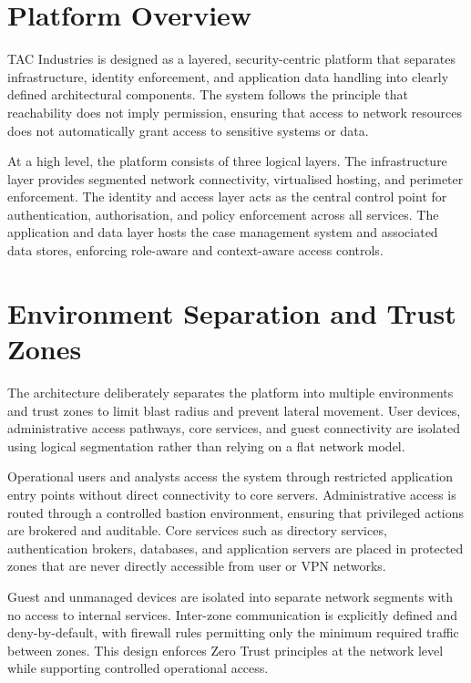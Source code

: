 \section{Platform Overview}

TAC Industries is designed as a layered, security-centric platform that separates infrastructure, identity enforcement, and application data handling into clearly defined architectural components. The system follows the principle that reachability does not imply permission, ensuring that access to network resources does not automatically grant access to sensitive systems or data.

At a high level, the platform consists of three logical layers. The infrastructure layer provides segmented network connectivity, virtualised hosting, and perimeter enforcement. The identity and access layer acts as the central control point for authentication, authorisation, and policy enforcement across all services. The application and data layer hosts the case management system and associated data stores, enforcing role-aware and context-aware access controls.

\section{Environment Separation and Trust Zones}

The architecture deliberately separates the platform into multiple environments and trust zones to limit blast radius and prevent lateral movement. User devices, administrative access pathways, core services, and guest connectivity are isolated using logical segmentation rather than relying on a flat network model.

Operational users and analysts access the system through restricted application entry points without direct connectivity to core servers. Administrative access is routed through a controlled bastion environment, ensuring that privileged actions are brokered and auditable. Core services such as directory services, authentication brokers, databases, and application servers are placed in protected zones that are never directly accessible from user or VPN networks.

Guest and unmanaged devices are isolated into separate network segments with no access to internal services. Inter-zone communication is explicitly defined and deny-by-default, with firewall rules permitting only the minimum required traffic between zones. This design enforces Zero Trust principles at the network level while supporting controlled operational access.


